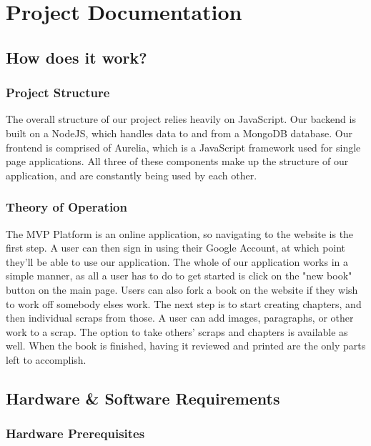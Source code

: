 \documentclass[onecolumn, draftclsnofoot,10pt, compsoc]{IEEEtran}
\begin{document}
\section{Project Documentation}

\subsection{How does it work?}


\subsubsection{Project Structure}

The overall structure of our project relies heavily on JavaScript. Our backend is built on a NodeJS, which handles data to and from a MongoDB database. Our frontend is comprised of Aurelia, which is a JavaScript framework used for single page applications. All three of these components make up the structure of our application, and are constantly being used by each other.

\subsubsection{Theory of Operation}

The MVP Platform is an online application, so navigating to the website is the first step. A user can then sign in using their Google Account, at which point they'll be able to use our application. The whole of our application works in a simple manner, as all a user has to do to get started is click on the "new book" button on the main page. Users can also fork a book on the website if they wish to work off somebody elses work. The next step is to start creating chapters, and then individual scraps from those. A user can add images, paragraphs, or other work to a scrap. The option to take others' scraps and chapters is available as well. When the book is finished, having it reviewed and printed are the only parts left to accomplish.

\subsection{Hardware \& Software Requirements}

\subsubsection{Hardware Prerequisites}
\end{document}
